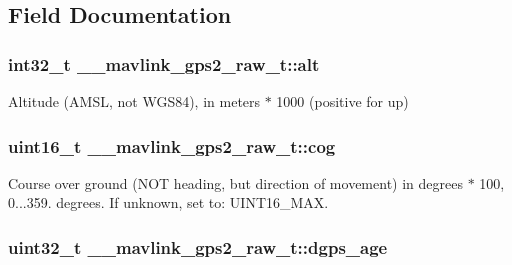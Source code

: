 \subsection{Field Documentation}
\hypertarget{struct____mavlink__gps2__raw__t_a80e10f0957688a9b8038254555c06df6}{
\subsubsection[{alt}]{\setlength{\rightskip}{0pt plus 5cm}int32\+\_\+t \+\_\+\+\_\+mavlink\+\_\+gps2\+\_\+raw\+\_\+t\+::alt}}\label{struct____mavlink__gps2__raw__t_a80e10f0957688a9b8038254555c06df6}


Altitude (A\+M\+S\+L, not W\+G\+S84), in meters $\ast$ 1000 (positive for up) 

\hypertarget{struct____mavlink__gps2__raw__t_a1bac9f4f74dff39a5f1b4e3767734b21}{
\subsubsection[{cog}]{\setlength{\rightskip}{0pt plus 5cm}uint16\+\_\+t \+\_\+\+\_\+mavlink\+\_\+gps2\+\_\+raw\+\_\+t\+::cog}}\label{struct____mavlink__gps2__raw__t_a1bac9f4f74dff39a5f1b4e3767734b21}


Course over ground (N\+O\+T heading, but direction of movement) in degrees $\ast$ 100, 0...359. degrees. If unknown, set to\+: U\+I\+N\+T16\+\_\+\+M\+A\+X. 

\hypertarget{struct____mavlink__gps2__raw__t_a91a398a7a4642951e1648e042c2e32cb}{
\subsubsection[{dgps\+\_\+age}]{\setlength{\rightskip}{0pt plus 5cm}uint32\+\_\+t \+\_\+\+\_\+mavlink\+\_\+gps2\+\_\+raw\+\_\+t\+::dgps\+\_\+age}}\label{struct____mavlink__gps2__raw__t_a91a398a7a4642951e1648e042c2e32cb}


